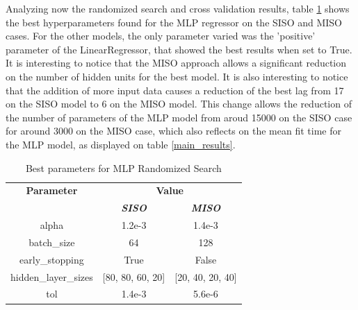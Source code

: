 \documentclass[conference]{IEEEtran}
\begin{document}
Analyzing now the randomized search and cross validation results, table \ref{mlp_results} shows the best hyperparameters found for the MLP regressor on the SISO and MISO cases. For the other models, the only parameter varied was the 'positive' parameter of the LinearRegressor, that showed the best results when set to True. It is interesting to notice that the MISO approach allows a significant reduction on the number of hidden units for the best model. It is also interesting to notice that the addition of more input data causes a reduction of the best lag from 17 on the SISO model to 6 on the MISO model. This change allows the reduction of the number of parameters of the MLP model from aroud 15000 on the SISO case for around 3000 on the MISO case, which also reflects on the mean fit time for the MLP model, as displayed on table \ref{main_results}.

\begin{table}[htbp]
\caption{Best parameters for MLP Randomized Search}
\begin{center}
\begin{tabular}{|c|c|c|}
\hline
\textbf{Parameter}&\multicolumn{2}{|c|}{\textbf{Value}} \\
\cline{2-3} 
\textbf{} & \textbf{\textit{SISO}} & \textbf{\textit{MISO}} \\
\hline
alpha                &           1.2e-3 &           1.4e-3  \\
\hline
batch\_size          &               64 &              128  \\
\hline
early\_stopping      &             True &            False  \\
\hline
hidden\_layer\_sizes & [80, 80, 60, 20] & [20, 40, 20, 40]  \\
\hline
tol                  &           1.4e-3 &           5.6e-6  \\
\hline
\end{tabular}
\label{mlp_results}
\end{center}
\end{table}


\end{document}
